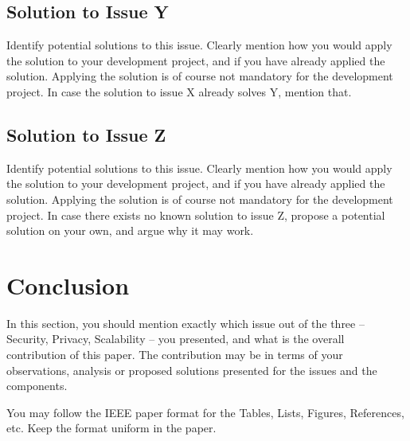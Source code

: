 \documentclass[conference]{IEEEtran}
\begin{document}
\subsection{Solution to Issue Y}
Identify potential solutions to this issue. Clearly mention how you would apply the solution to your development project, and if you have already applied the solution. Applying the solution is of course not mandatory for the development project. In case the solution to issue X already solves Y, mention that.

\subsection{Solution to Issue Z}
Identify potential solutions to this issue. Clearly mention how you would apply the solution to your development project, and if you have already applied the solution. Applying the solution is of course not mandatory for the development project. In case there exists no known solution to issue Z, propose a potential solution on your own, and argue why it may work.

\section{Conclusion}
In this section, you should mention exactly which issue out of the three -- Security, Privacy, Scalability -- you presented, and what is the overall contribution of this paper. The contribution may be in terms of your observations, analysis or proposed solutions presented for the issues and the components.

You may follow the IEEE paper format for the Tables, Lists, Figures, References, etc. Keep the format uniform in the paper.


 

\end{document}
